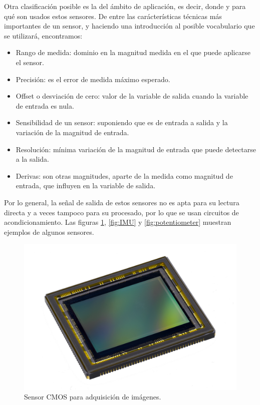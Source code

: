 Otra clasificación posible es la del ámbito de aplicación, es decir, donde y para qué son usados estos sensores. \newline
De entre las carácterísticas técnicas más importantes de un sensor, y haciendo una introducción al posible vocabulario que se utilizará, encontramos:

\begin{itemize}
	\item Rango de medida:  dominio en la magnitud medida en el que puede aplicarse el sensor.
	\item Precisión: es el error de medida máximo esperado.
	\item Offset o desviación de cero: valor de la variable de salida cuando la variable de entrada es nula.
	\item Sensibilidad de un sensor: suponiendo que es de entrada a salida y la variación de la magnitud de entrada.
	\item Resolución: mínima variación de la magnitud de entrada que puede detectarse a la salida.
	\item Derivas: son otras magnitudes, aparte de la medida como magnitud de entrada, que influyen en la variable de salida.
\end{itemize}

Por lo general, la señal de salida de estos sensores no es apta para su lectura directa y a veces tampoco para su procesado, por lo que se usan circuitos de acondicionamiento. Las figuras \ref{fig:camara_CMOS}, \ref{fig:IMU} y \ref{fig:potentiometer} muestran ejemplos de algunos sensores.

\begin{center}
	\begin{figure}[H]
		\center
		\includegraphics[scale=0.1]{imagenes/EstadoArte/sensor_imagen_CMOS.jpg}
		\caption{Sensor CMOS para adquisición de imágenes.}
		\label{fig:camara_CMOS}
	\end{figure}
\end{center}

